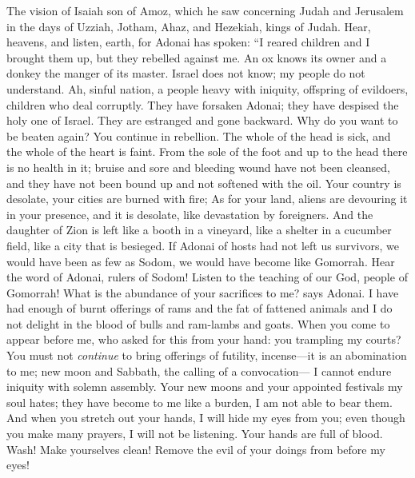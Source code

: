 
\begin{biblechapter} %
 The vision of Isaiah son of Amoz, which he saw concerning Judah and Jerusalem in the days of Uzziah, Jotham, Ahaz, and Hezekiah, kings of Judah.
 Hear, heavens, 
and listen, earth, 
for Adonai has spoken: 
“I reared children 
and I brought them up, 
but they rebelled against me.
\verse An ox knows its owner 
and a donkey the manger of its master. 
Israel does not know; 
my people do not understand.
\verse Ah, sinful nation, 
a people heavy with iniquity, 
offspring of evildoers, 
children who deal corruptly. 
They have forsaken Adonai; 
they have despised the holy one of Israel. 
They are estranged and gone backward.
\verse Why do you want to be beaten again? 
You continue in rebellion. 
The whole of the head is sick, 
and the whole of the heart is faint.
\verse From the sole of the foot and up to the head 
there is no health in it; 
bruise and sore and bleeding wound have not been cleansed, 
and they have not been bound up 
and not softened with the oil.
\verse Your country is desolate, 
your cities are burned with fire; 
As for your land, aliens are devouring it in your presence, 
and it is desolate, like devastation by foreigners.
\verse And the daughter of Zion is left like a booth in a vineyard, 
like a shelter in a cucumber field, 
like a city that is besieged.
\verse If Adonai of hosts had not left us survivors, 
we would have been as few as Sodom, 
we would have become like Gomorrah.
\verse Hear the word of Adonai, rulers of Sodom! 
Listen to the teaching of our God, people of Gomorrah!
\verse What is the abundance of your sacrifices to me? says Adonai. 
I have had enough of burnt offerings of rams 
and the fat of fattened animals 
and I do not delight in the blood of bulls 
and ram-lambs and goats.
\verse When you come to appear before me, 
who asked for this from your hand: 
you trampling my courts?
\verse You must not \textit{continue} to bring offerings of futility, 
incense—it is an abomination to me; 
new moon and Sabbath, the calling of a convocation— 
I cannot endure iniquity with solemn assembly.
\verse Your new moons and your appointed festivals my soul hates; 
they have become to me like a burden, 
I am not able to bear them.
\verse And when you stretch out your hands, 
I will hide my eyes from you; 
even though you make many prayers, 
I will not be listening. 
Your hands are full of blood.
\verse Wash! Make yourselves clean! 
Remove the evil of your doings from before my eyes! 

\end{biblechapter}
